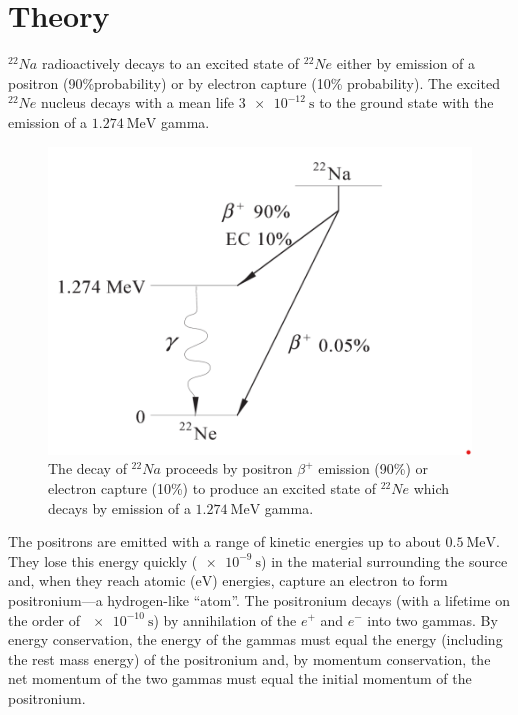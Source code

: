\documentclass[%
 reprint,
nofootinbib,
 amsmath,amssymb,
 aps,
floatfix,
]{revtex4-2}
\begin{document}
\section{Theory}
    $^{22}Na$ radioactively decays to an excited state of $^{22}Ne$ either by emission of a positron (90\%probability) or by electron capture (10\% probability). The excited $^{22}Ne$ nucleus decays with a mean life $\SI{3e-12}{\second}$ to the ground state with the emission of a $\SI{1.274}{\mega \electronvolt}$ gamma.
    \begin{figure}
        \centering
        \includegraphics[scale = 0.8]{Figures/na-22.png}
        \caption{The decay of $^{22}Na$ proceeds by positron $\beta^+$ emission (90\%) or electron capture (10\%) to produce an excited state of $^{22}Ne$ which decays by emission of a $\SI{1.274}{\mega \electronvolt}$ gamma.}
        \label{fig:my_label}
    \end{figure}
    \par
    The positrons are emitted with a range of kinetic energies up to about $\SI{0.5}{\mega \electronvolt}$. They lose this energy quickly ($\SI{e-9}{\second}$) in the material surrounding the source and, when they reach atomic ($\si{\electronvolt}$) energies, capture an electron to form positronium—a hydrogen-like ``atom''. The positronium decays (with a lifetime on the order of $\SI{e-10}{\second}$) by annihilation of the $e^+$ and $e^-$ into two gammas. By energy conservation, the energy of the gammas must equal the energy (including the rest mass energy) of the positronium and, by momentum conservation, the net momentum of the two gammas must equal the initial momentum of the positronium. 
    \par
\end{document}
